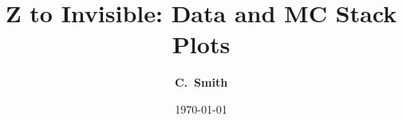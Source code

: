 \documentclass[10pt,xcolor=svgnames,fleqn,aspectratio=169]{beamer}
\title{Z to Invisible: Data and MC Stack Plots}
\author{\textcolor{DodgerBlueDark}{\bf C.~Smith\inst{1}}}
\institute{\inst{1} Baylor}
\date{\today}
\begin{document}
\begin{frame}[plain]
\maketitle
\end{frame}




\end{document}
